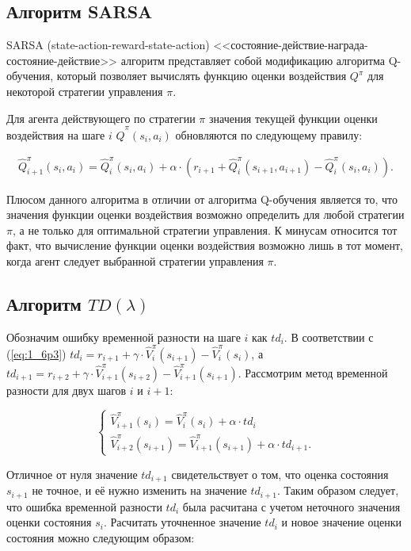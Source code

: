 \subsection{Алгоритм SARSA} \label{subsect1_6_3}
SARSA (state-action-reward-state-action) <<состояние-действие-награда-состояние-действие>> алгоритм представляет собой модификацию алгоритма Q-обучения, который позволяет вычислять функцию оценки воздействия $ Q^{\pi} $ для некоторой стратегии управления $ \pi $. 

Для агента действующего по стратегии $ \pi $ значения текущей функции оценки воздействия на шаге $ i $ $ \hat{Q}^{\pi}(s_i, a_i) $ обновляются по следующему правилу:

\begin{equation}
\label{eq:1_6p5}
\begin{alignedat}{2}
\hat{Q}^{\pi}_{i+1}(s_i, a_i) = \hat{Q}^{\pi}_{i}(s_i, a_i)+\alpha\cdot ( r_{i+1} + \hat{Q}^{\pi}_{i}(s_{i+1}, a_{i+1}) - \hat{Q}^{\pi}_{i}(s_{i}, a_i)).
\end{alignedat}
\end{equation}

Плюсом данного алгоритма в отличии от алгоритма Q-обучения является то, что значения функции оценки воздействия возможно определить для любой стратегии $ \pi $, а не только для оптимальной стратегии управления. К минусам относится тот факт, что вычисление функции оценки воздействия возможно лишь в тот момент, когда агент следует выбранной стратегии управления $ \pi $.

\subsection{Алгоритм $TD(\lambda)$} \label{subsect1_6_4}

Обозначим ошибку временной разности на шаге $ i $ как $ td_i $. В соответствии с (\ref{eq:1_6p3}) $ td_i = r_{i+1} + \gamma\cdot\hat{V}^{\pi}_{i}(s_{i+1})-\hat{V}^{\pi}_{i}(s_{i}) $,   а $ td_{i+1} = r_{i+2} + \gamma\cdot\hat{V}^{\pi}_{i+1}(s_{i+2})-\hat{V}^{\pi}_{i+1}(s_{i+1}) $. Рассмотрим метод временной разности для двух шагов $ i $ и $ i+1 $:

$$
 \begin{cases}
  \hat{V}^{\pi}_{i+1}(s_i) = \hat{V}^{\pi}_{i}(s_i)+\alpha\cdot td_i \\
  \hat{V}^{\pi}_{i+2}(s_{i+1}) = \hat{V}^{\pi}_{i+1}(s_{i+1})+\alpha\cdot td_{i+1}.
 \end{cases}
$$

Отличное от нуля значение $ td_{i+1} $ свидетельствует о том, что оценка состояния $ s_{i+1} $ не точное, и её нужно изменить на значение $ td_{i+1} $. Таким образом следует, что ошибка временной разности $ td_i $ была расчитана с учетом неточного значения оценки состояния $ s_i $. Расчитать уточненное значение $ td_i $ и новое значение оценки состояния можно следующим образом:

